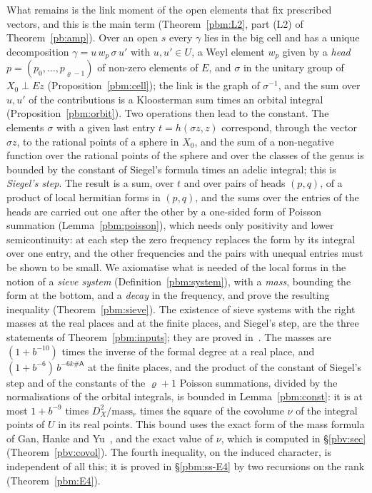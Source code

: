 \documentclass[10pt]{amsart}
\theoremstyle{definition}
\theoremstyle{remark}
\providecommand{\auDX}{D_X}
\begin{document}
What remains is the link moment of the open elements that fix prescribed vectors, and this is
the main term (Theorem~\ref{pbm:L2}, part (L2) of Theorem~\ref{pb:amp}). Over an open $s$ every $\gamma$
lies in the big cell and has a unique decomposition $\gamma=u\,w_p\,\sigma\,u'$ with $u,u'\in U$,
a Weyl element $w_p$ given by a \emph{head} $p=(p_0,\dots,p_{\varrho-1})$ of non-zero elements of
$E$, and $\sigma$ in the unitary group of $X_0\perp Ez$ (Proposition~\ref{pbm:cell}); the link is
the graph of $\sigma^{-1}$, and the sum over $u,u'$ of the contributions is a Kloosterman sum times
an orbital integral (Proposition~\ref{pbm:orbit}). Two operations then lead to the constant. The
elements $\sigma$ with a given last entry $t=h(\sigma z,z)$ correspond, through the vector
$\sigma z$, to the rational points of a sphere in $X_0$, and the sum of a non-negative function
over the rational points of the sphere and over the classes of the genus is bounded by the
constant of Siegel's formula times an adelic integral; this is \emph{Siegel's step}. The result
is a sum, over $t$ and over pairs of heads $(p,q)$, of a product of local hermitian forms in
$(p,q)$, and the sums over the entries of the heads are carried out one after the other by a
one-sided form of Poisson summation (Lemma~\ref{pbm:poisson}), which needs only positivity and
lower semicontinuity: at each step the zero frequency replaces the form by its integral over one
entry, and the other frequencies and the pairs with unequal entries must be shown to be small.
We axiomatise what is needed of the local forms in the notion of a \emph{sieve system}
(Definition~\ref{pbm:system}), with a \emph{mass}, bounding the form at the bottom, and a
\emph{decay} in the frequency, and prove the resulting inequality (Theorem~\ref{pbm:sieve}). The
existence of sieve systems with the right masses at the real places and at the finite places, and
Siegel's step, are the three statements of Theorem~\ref{pbm:inputs}; they are proved
in~\cite{P52}. The masses are $(1+b^{-10})$ times the inverse of the formal degree at a real
place, and $(1+b^{-6})\,b^{-6k\#\mathsf A}$ at the finite places, and the product of the constant
of Siegel's step and of the constants of the $\varrho+1$ Poisson summations, divided by the
normalisations of the orbital integrals, is bounded in Lemma~\ref{pbm:const}: it is at most $1+b^{-9}$ times
$\auDX^2/\mathrm{mass}_r$ times the square of the covolume $\nu$ of the integral points of $U$ in
its real points. This bound uses the exact form of the mass formula
of Gan, Hanke and Yu~\cite{GHY}, and the exact value of $\nu$, which is computed in
\S\ref{pbv:sec} (Theorem~\ref{pbv:covol}). The fourth inequality, on the induced character,
is independent of all this; it is proved in \S\ref{pbm:ss-E4} by two recursions on the rank
(Theorem~\ref{pbm:E4}).
\end{document}
